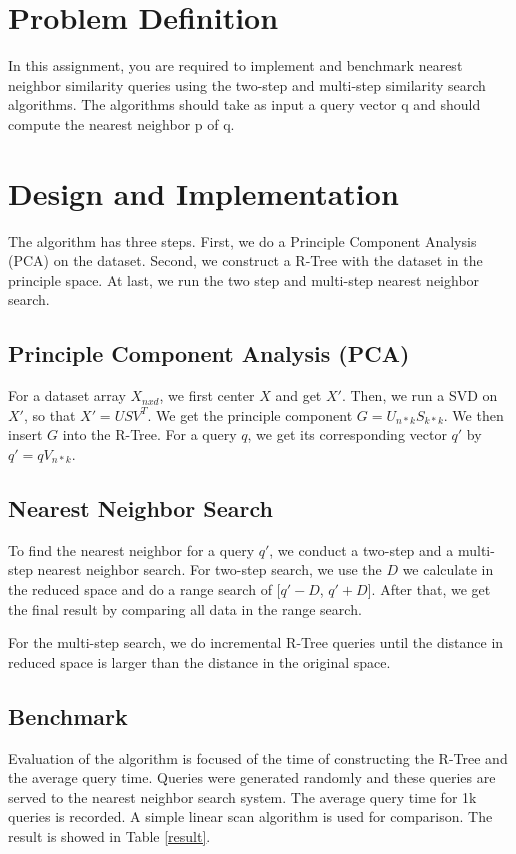 \documentclass{article}
\begin{document}
\section{Problem Definition}
In this assignment, you are required to implement and benchmark nearest
neighbor similarity queries using
the two-step and multi-step similarity search
algorithms. The algorithms should take as input a query
vector q and should compute the nearest neighbor p of q.

\section{Design and Implementation}
The algorithm has three steps. First, we do a Principle Component Analysis (PCA)
on the dataset. Second, we construct a R-Tree with the dataset in the principle
space. At last, we run the two step and multi-step nearest neighbor search.

\subsection{Principle Component Analysis (PCA)}
For a dataset array $X_{nxd}$, we first center $X$ and get $X'$. Then,
we run a SVD on $X'$, so that $X' = USV^T$. We get the principle component
$G = U_{n*k}S_{k*k}$. We then insert $G$ into the R-Tree. For a query $q$,
we get its corresponding vector $q'$ by $q' = qV_{n*k}$.


\subsection{Nearest Neighbor Search}
To find the nearest neighbor for a query $q'$, we conduct a two-step and a multi-step
nearest neighbor search. For two-step search, we use the $D$ we calculate in
the reduced space and do a range search of [$q' - D$, $q' + D$]. After that, we
get the final result by comparing all data in the range search.

For the multi-step search, we do incremental R-Tree queries until the distance
in reduced space
is larger than the distance in the original space.

\subsection{Benchmark}
Evaluation of the algorithm is focused of the time of constructing the R-Tree
and the average query time.
Queries were generated randomly and
these queries are served to the nearest neighbor search system.
The average
query time for 1k queries is recorded. A simple linear scan algorithm is
used for comparison. The result is showed in Table \ref{result}.
\end{document}
